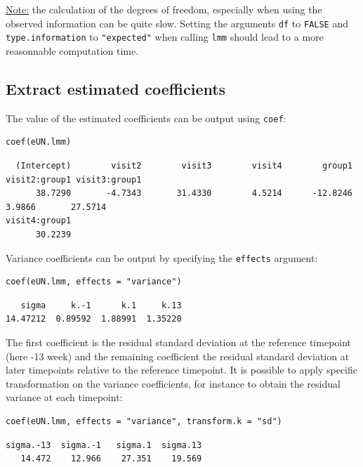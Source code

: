 \documentclass[12pt]{article}
\begin{document}
\uline{Note:} the calculation of the degrees of freedom, especially when
using the observed information can be quite slow. Setting the
arguments \texttt{df} to \texttt{FALSE} and \texttt{type.information} to \texttt{"expected"} when
calling \texttt{lmm} should lead to a more reasonnable computation time.

\subsection{Extract estimated coefficients}
\label{sec:orge5db888}
The value of the estimated coefficients can be output using \texttt{coef}:
\lstset{language=r,label= ,caption= ,captionpos=b,numbers=none}
\begin{lstlisting}
coef(eUN.lmm)
\end{lstlisting}

\begin{verbatim}
  (Intercept)        visit2        visit3        visit4        group1 visit2:group1 visit3:group1 
      38.7290       -4.7343       31.4330        4.5214      -12.8246        3.9866       27.5714 
visit4:group1 
      30.2239
\end{verbatim}


Variance coefficients can be output by specifying the \texttt{effects} argument:
\lstset{language=r,label= ,caption= ,captionpos=b,numbers=none}
\begin{lstlisting}
coef(eUN.lmm, effects = "variance")
\end{lstlisting}

\begin{verbatim}
   sigma     k.-1      k.1     k.13 
14.47212  0.89592  1.88991  1.35220
\end{verbatim}


The first coefficient is the residual standard deviation at the
reference timepoint (here -13 week) and the remaining coefficient the
residual standard deviation at later timepoints relative to the
reference timepoint. It is possible to apply specific transformation
on the variance coefficients, for instance to obtain the residual
variance at each timepoint:
\lstset{language=r,label= ,caption= ,captionpos=b,numbers=none}
\begin{lstlisting}
coef(eUN.lmm, effects = "variance", transform.k = "sd")
\end{lstlisting}

\begin{verbatim}
sigma.-13  sigma.-1   sigma.1  sigma.13 
   14.472    12.966    27.351    19.569
\end{verbatim}
\end{document}
